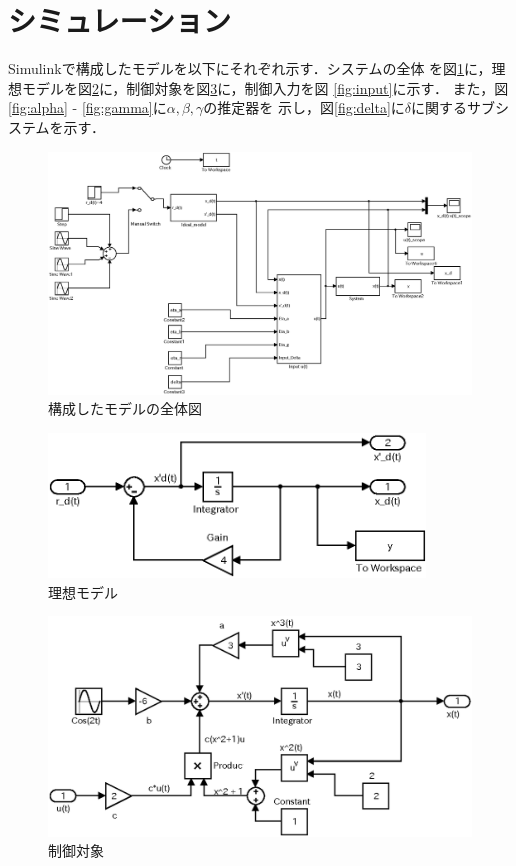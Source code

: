 \documentclass[a4paper,12pt]{jarticle}
\begin{document}
\section{シミュレーション}
Simulinkで構成したモデルを以下にそれぞれ示す．システムの全体
を図\ref{fig:zentai}に，理想モデルを図\ref{fig:ideal}に，制御対象を図\ref{fig:System}に，制御入力を図
\ref{fig:input}に示す．
また，図\ref{fig:alpha} - \ref{fig:gamma}に$\alpha,\beta,\gamma$の推定器を
示し，図\ref{fig:delta}に$\delta$に関するサブシステムを示す．
%
\begin{figure}[b]
    \begin{center}
       \includegraphics[width=170mm]{fig/zentai.eps}
        \caption{構成したモデルの全体図}
        \label{fig:zentai}
    \end{center}
 \end{figure}
%
%
\begin{figure}[tb]
    \begin{center}
       \includegraphics[width=100mm]{fig/ideal.eps}
        \caption{理想モデル}
        \label{fig:ideal}
    \end{center}
 \end{figure}
\begin{figure}[tb]
    \begin{center}
       \includegraphics[width=120mm]{fig/System.eps}
        \caption{制御対象}
        \label{fig:System}
    \end{center}
 \end{figure}
\end{document}
